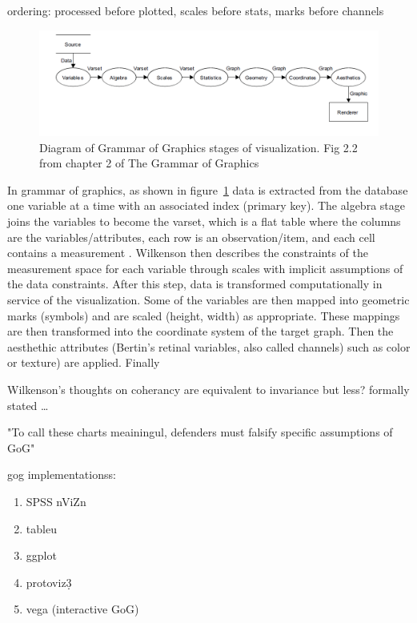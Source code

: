 \documentclass[letterpaper,onecolumn,titlepage]{Ythesis}
\begin{document}
ordering: processed before plotted, 
scales before stats, marks before channels
\begin{figure}
\includegraphics[]{figures/intro/gog_pathway.png}
\caption{Diagram of Grammar of Graphics stages of visualization. Fig 2.2 from chapter 2 of The Grammar of Graphics\cite{wilkinsonGrammarGraphics2005}}
\label{fig:gog_pathway}
\end{figure}
In grammar of graphics, as shown in figure~\ref{fig:gog_pathway} data is extracted from the database one variable at a time with an associated index (primary key). The algebra stage joins the variables to become the varset, which is a flat table where the columns are the variables/attributes, each row is an observation/item, and each cell contains a measurement \cite{munznerChDataAbstraction}. Wilkenson then describes the constraints of the measurement space for each variable through scales \cite{wilkinsonGrammarGraphics2005} with implicit assumptions of the data constraints. After this step, data is transformed computationally in service of the visualization. Some of the variables are then mapped into geometric marks (symbols) and are scaled (height, width) as appropriate. These mappings are then transformed into the coordinate system of the target graph. Then the aesthethic attributes (Bertin's retinal variables, also called channels) such as color or  texture) are applied. Finally

Wilkenson's thoughts on coherancy are equivalent to invariance but less? formally stated \dots

"To call these charts meainingul, defenders must falsify specific assumptions of GoG" \cite{wilkinsonMathematicalFoundationAnalytic2010}


gog implementationss:
\begin{enumerate}
    \item SPSS nViZn
    \item tableu
    \item ggplot
    \item protoviz\d3
    \item vega (interactive GoG)
\end{enumerate}


\printbibliography
\end{document}

